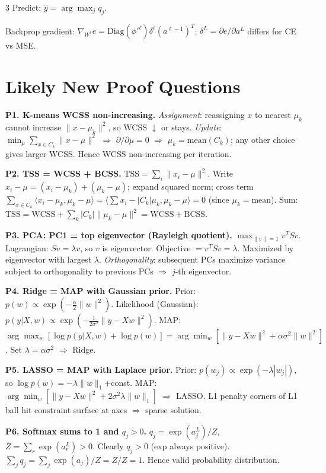 \documentclass[8pt,fleqn]{extarticle}
\begin{document}
\begin{multicols}{3}
Predict: $\hat y=\arg\max_j q_j$.

Backprop gradient: $\nabla_{W^\ell}e=\text{Diag}(\phi'^\ell)\delta^\ell(a^{\ell-1})^T$; $\delta^L=\partial e/\partial a^L$ differs for CE vs MSE.


\section*{Likely New Proof Questions}

\textbf{P1. K-means WCSS non-increasing.}
\textit{Assignment}: reassigning $x$ to nearest $\mu_k$ cannot increase $\|x-\mu_k\|^2$, so WCSS $\downarrow$ or stays.
\textit{Update}: $\min_\mu\sum_{x\in C_k}\|x-\mu\|^2$ $\Rightarrow$ $\partial/\partial\mu=0$ $\Rightarrow$ $\mu_k=\text{mean}(C_k)$; any other choice gives larger WCSS. Hence WCSS non-increasing per iteration.

\textbf{P2. TSS = WCSS + BCSS.}
$\text{TSS}=\sum_i\|x_i-\mu\|^2$. Write $x_i-\mu=(x_i-\mu_k)+(\mu_k-\mu)$; expand squared norm; cross term $\sum_{x\in C_k}\langle x_i-\mu_k,\mu_k-\mu\rangle=\langle\sum x_i-|C_k|\mu_k,\mu_k-\mu\rangle=0$ (since $\mu_k=\text{mean}$). Sum: $\text{TSS}=\text{WCSS}+\sum_k|C_k|\|\mu_k-\mu\|^2=\text{WCSS}+\text{BCSS}$.

\textbf{P3. PCA: PC1 = top eigenvector (Rayleigh quotient).}
$\max_{\|v\|=1}v^TSv$. Lagrangian: $Sv=\lambda v$, so $v$ is eigenvector. Objective $=v^TSv=\lambda$. Maximized by eigenvector with largest $\lambda$. \textit{Orthogonality}: subsequent PCs maximize variance subject to orthogonality to previous PCs $\Rightarrow$ $j$-th eigenvector.

\textbf{P4. Ridge = MAP with Gaussian prior.}
Prior: $p(w)\propto\exp(-\frac{\alpha}{2}\|w\|^2)$. Likelihood (Gaussian): $p(y|X,w)\propto\exp(-\frac{1}{2\sigma^2}\|y-Xw\|^2)$. MAP: $\arg\max_w[\log p(y|X,w)+\log p(w)]=\arg\min_w[\|y-Xw\|^2+\alpha\sigma^2\|w\|^2]$. Set $\lambda=\alpha\sigma^2$ $\Rightarrow$ Ridge.

\textbf{P5. LASSO = MAP with Laplace prior.}
Prior: $p(w_j)\propto\exp(-\lambda|w_j|)$, so $\log p(w)=-\lambda\|w\|_1$+const. MAP: $\arg\min_w[\|y-Xw\|^2+2\sigma^2\lambda\|w\|_1]$ $\Rightarrow$ LASSO. L1 penalty corners of L1 ball hit constraint surface at axes $\Rightarrow$ sparse solution.

\textbf{P6. Softmax sums to 1 and $q_j>0$.}
$q_j=\exp(a_j^L)/Z$, $Z=\sum_r\exp(a_r^L)>0$. Clearly $q_j>0$ (exp always positive). $\sum_jq_j=\sum_j\exp(a_j)/Z=Z/Z=1$. Hence valid probability distribution.


\end{multicols}
\end{document}
